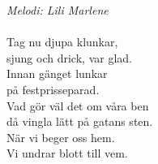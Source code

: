 {\footnotesize\textit{Melodi: Lili Marlene}}\\
\\
Tag nu djupa klunkar,\\
sjung och drick, var glad.\\
Innan gänget lunkar\\
på festprisseparad.\\
Vad gör väl det om våra ben\\
då vingla lätt på gatans sten.\\
När vi beger oss hem.\\
Vi undrar blott till vem.
